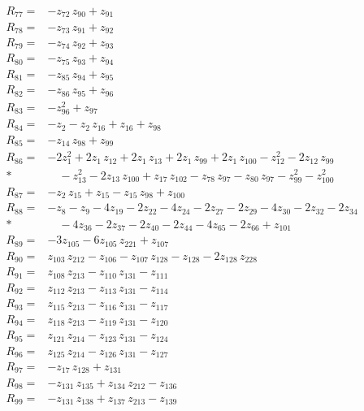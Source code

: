 \begin{align*}
R_{77}={}& -z_{72}\,z_{90} + z_{91} \\[2pt]
R_{78}={}& -z_{73}\,z_{91} + z_{92} \\[2pt]
R_{79}={}& -z_{74}\,z_{92} + z_{93} \\[2pt]
R_{80}={}& -z_{75}\,z_{93} + z_{94} \\[2pt]
R_{81}={}& -z_{85}\,z_{94} + z_{95} \\[2pt]
R_{82}={}& -z_{86}\,z_{95} + z_{96} \\[2pt]
R_{83}={}& -z_{96}^{2} + z_{97} \\[2pt]
R_{84}={}& -z_{2} - z_{2}\,z_{16} + z_{16} + z_{98} \\[2pt]
R_{85}={}& -z_{14}\,z_{98} + z_{99} \\[2pt]
R_{86}={}& -2z_{1}^{2} + 2z_{1}\,z_{12} + 2z_{1}\,z_{13} + 2z_{1}\,z_{99} + 2z_{1}\,z_{100} - z_{12}^{2} - 2z_{12}\,z_{99} \\*
&\quad  - z_{13}^{2} - 2z_{13}\,z_{100} + z_{17}\,z_{102} - z_{78}\,z_{97} - z_{80}\,z_{97} - z_{99}^{2} - z_{100}^{2} \\[2pt]
R_{87}={}& -z_{2}\,z_{15} + z_{15} - z_{15}\,z_{98} + z_{100} \\[2pt]
R_{88}={}& -z_{8} - z_{9} - 4z_{19} - 2z_{22} - 4z_{24} - 2z_{27} - 2z_{29} - 4z_{30} - 2z_{32} - 2z_{34} \\*
&\quad  - 4z_{36} - 2z_{37} - 2z_{40} - 2z_{44} - 4z_{65} - 2z_{66} + z_{101} \\[2pt]
R_{89}={}& -3z_{105} - 6z_{105}\,z_{221} + z_{107} \\[2pt]
R_{90}={}& z_{103}\,z_{212} - z_{106} - z_{107}\,z_{128} - z_{128} - 2z_{128}\,z_{228} \\[2pt]
R_{91}={}& z_{108}\,z_{213} - z_{110}\,z_{131} - z_{111} \\[2pt]
R_{92}={}& z_{112}\,z_{213} - z_{113}\,z_{131} - z_{114} \\[2pt]
R_{93}={}& z_{115}\,z_{213} - z_{116}\,z_{131} - z_{117} \\[2pt]
R_{94}={}& z_{118}\,z_{213} - z_{119}\,z_{131} - z_{120} \\[2pt]
R_{95}={}& z_{121}\,z_{214} - z_{123}\,z_{131} - z_{124} \\[2pt]
R_{96}={}& z_{125}\,z_{214} - z_{126}\,z_{131} - z_{127} \\[2pt]
R_{97}={}& -z_{17}\,z_{128} + z_{131} \\[2pt]
R_{98}={}& -z_{131}\,z_{135} + z_{134}\,z_{212} - z_{136} \\[2pt]
R_{99}={}& -z_{131}\,z_{138} + z_{137}\,z_{213} - z_{139} \\[2pt]

\end{align*}
